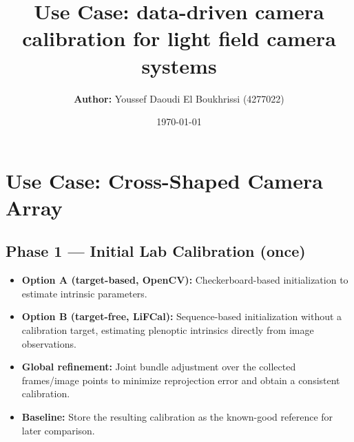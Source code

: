 \documentclass[12pt]{scrartcl}
\title{\vspace{5cm}\textbf{Use Case:} data-driven camera calibration for light field camera systems}
\author{\textbf{Author: } Youssef Daoudi El Boukhrissi (4277022)}
\date{\today}
\begin{document}
\maketitle

\newpage
{}

\section*{Use Case: Cross-Shaped Camera Array 
}


\subsection*{Phase 1 — Initial Lab Calibration (once)}
\begin{itemize}
  \item \textbf{Option A (target-based, OpenCV):} Checkerboard-based initialization to estimate intrinsic parameters.
  \item \textbf{Option B (target-free, LiFCal):} Sequence-based initialization without a calibration target, estimating    plenoptic intrinsics directly from image observations.
  \item \textbf{Global refinement:} Joint bundle adjustment over the collected frames/image points to minimize reprojection error and obtain a consistent calibration.
  \item \textbf{Baseline:} Store the resulting calibration as the known-good reference for later comparison.
\end{itemize}
\end{document}
